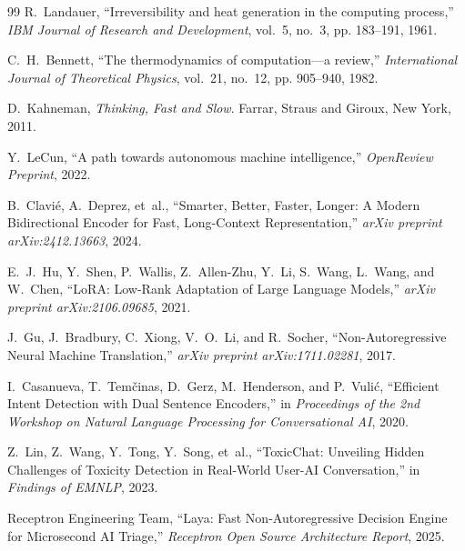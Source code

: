 \documentclass[10pt,journal,compsoc]{IEEEtran}
\theoremstyle{remark}
\begin{document}
\begin{thebibliography}{99}
R.~Landauer, ``Irreversibility and heat generation in the computing process,'' \emph{IBM Journal of Research and Development}, vol.~5, no.~3, pp. 183--191, 1961.

C.~H.~Bennett, ``The thermodynamics of computation---a review,'' \emph{International Journal of Theoretical Physics}, vol.~21, no.~12, pp. 905--940, 1982.

D.~Kahneman, \emph{Thinking, Fast and Slow}. Farrar, Straus and Giroux, New York, 2011.

Y.~LeCun, ``A path towards autonomous machine intelligence,'' \emph{OpenReview Preprint}, 2022.

B.~Clavi\'e, A.~Deprez, et~al., ``Smarter, Better, Faster, Longer: A Modern Bidirectional Encoder for Fast, Long-Context Representation,'' \emph{arXiv preprint arXiv:2412.13663}, 2024.

E.~J.~Hu, Y.~Shen, P.~Wallis, Z.~Allen-Zhu, Y.~Li, S.~Wang, L.~Wang, and W.~Chen, ``LoRA: Low-Rank Adaptation of Large Language Models,'' \emph{arXiv preprint arXiv:2106.09685}, 2021.

J.~Gu, J.~Bradbury, C.~Xiong, V.~O.~Li, and R.~Socher, ``Non-Autoregressive Neural Machine Translation,'' \emph{arXiv preprint arXiv:1711.02281}, 2017.

I.~Casanueva, T.~Tem\v{c}inas, D.~Gerz, M.~Henderson, and P.~Vuli\'c, ``Efficient Intent Detection with Dual Sentence Encoders,'' in \emph{Proceedings of the 2nd Workshop on Natural Language Processing for Conversational AI}, 2020.

Z.~Lin, Z.~Wang, Y.~Tong, Y.~Song, et~al., ``ToxicChat: Unveiling Hidden Challenges of Toxicity Detection in Real-World User-AI Conversation,'' in \emph{Findings of EMNLP}, 2023.

Receptron Engineering Team, ``Laya: Fast Non-Autoregressive Decision Engine for Microsecond AI Triage,'' \emph{Receptron Open Source Architecture Report}, 2025.
\end{thebibliography}
\end{document}
